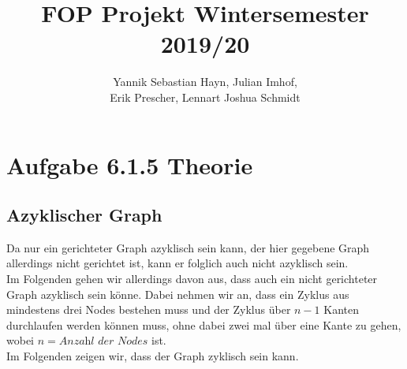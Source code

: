 \documentclass{article}
\title{FOP Projekt Wintersemester 2019/20}
\author{Yannik Sebastian Hayn, Julian Imhof,\\ Erik Prescher, Lennart Joshua Schmidt}
\begin{document}
\maketitle
\section{Aufgabe 6.1.5 Theorie}
\subsection{Azyklischer Graph}
Da nur ein gerichteter Graph azyklisch sein kann, der hier gegebene Graph allerdings nicht gerichtet ist, kann er folglich auch nicht azyklisch sein.\\
 Im Folgenden gehen wir allerdings davon aus, dass auch ein nicht gerichteter Graph azyklisch sein k\"onne. Dabei nehmen wir an, dass ein Zyklus aus mindestens drei Nodes bestehen muss und der Zyklus \"uber $n - 1$ Kanten durchlaufen werden k\"onnen muss, ohne dabei zwei mal \"uber eine Kante zu gehen, wobei $n = \textit{Anzahl der Nodes}$ ist.\\
Im Folgenden zeigen wir, dass der Graph zyklisch sein kann.\\
\end{document}
